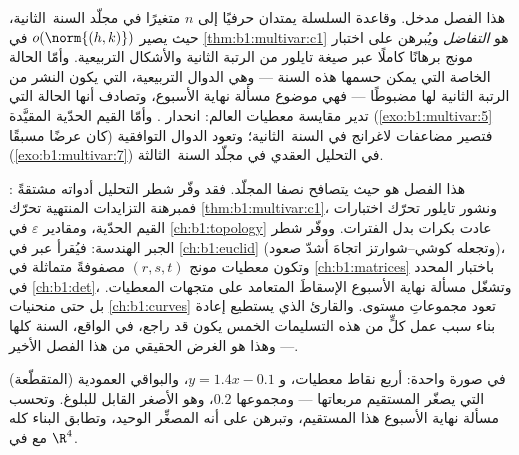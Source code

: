 \begin{remark}
\label{rem:b1:multivar:whereused}
هذا الفصل مدخل.  وقاعدة السلسلة يمتدان
حرفيًا إلى $n$ متغيرًا في مجلّد السنة~الثانية، حيث يصير
$o(\norm{(h,k)})$ في \cref{thm:b1:multivar:c1} هو
\emph{التفاضل} ويُبرهن على اختبار مونج برهانًا كاملًا عبر
صيغة تايلور من الرتبة الثانية والأشكال التربيعية. وأمّا الحالة الخاصة
التي يمكن حسمها هذه السنة --- وهي الدوال التربيعية،
التي يكون النشر من الرتبة الثانية لها مضبوطًا --- فهي موضوع
مسألة نهاية الأسبوع، وتصادف أنها الحالة التي تدير
مقايسة معطيات العالم: انحدار . وأمّا القيم
الحدّية المقيَّدة (\cref{exo:b1:multivar:5} كان عرضًا مسبقًا) فتصير مضاعفات
لاغرانج في السنة~الثانية؛ وتعود الدوال التوافقية
(\cref{exo:b1:multivar:7}) في التحليل العقدي في مجلّد
السنة~الثالثة.
\end{remark}

\begin{remark}
\label{rem:b1:multivar:perspectives}
هذا الفصل هو حيث يتصافح نصفا المجلّد. فقد وفّر
شطر التحليل أدواته مشتقةً : فمبرهنة
التزايدات المنتهية تحرّك \cref{thm:b1:multivar:c1}، ونشور
تايلور تحرّك اختبارات القيم الحدّية، ومقادير $\varepsilon$ في
\cref{ch:b1:topology} عادت بكرات بدل
الفترات. ووفّر شطر الجبر الهندسة: فيُقرأ 
عبر  في \cref{ch:b1:euclid}
(وتجعله كوشي--شوارتز اتجاهَ أشدّ صعود)، وتكون معطيات
مونج $(r, s, t)$ مصفوفةً متماثلة في
\cref{ch:b1:matrices} باختبار المحدد في
\cref{ch:b1:det}، وتشغّل مسألة نهاية الأسبوع الإسقاطَ
المتعامد على متجهات المعطيات. بل حتى منحنيات
\cref{ch:b1:curves} تعود مجموعاتِ مستوى. والقارئ الذي يستطيع
إعادة بناء سبب عمل كلٍّ من هذه التسليمات الخمس يكون قد
راجع، في الواقع، السنة كلها --- وهذا هو الغرض الحقيقي
من هذا الفصل الأخير.
\end{remark}

\begin{omfigure}

{\small {} في صورة واحدة: أربع نقاط معطيات، و
 $y = 1.4x - 0.1$، والبواقي العمودية
(المتقطّعة) التي يصغّر المستقيم مربعاتها --- ومجموعها $0.2$، وهو
الأصغر القابل للبلوغ. وتحسب مسألة نهاية الأسبوع هذا المستقيم،
وتبرهن على أنه المصغِّر الوحيد، وتطابق البناء كله
مع  في $\R^4$.}
\end{omfigure}

